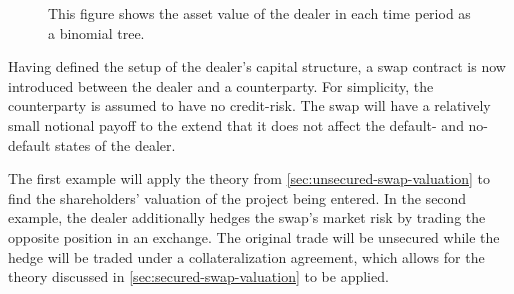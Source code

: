 \documentclass[main.tex]{subfiles}
\begin{document}
        \begin{figure}[H]
            \centering
            \caption{This figure shows the asset value of the dealer in each time period as a binomial tree.}
            \label{fig:example-asset-value-multi-period-dealer}
        \end{figure}

        Having defined the setup of the dealer's capital structure,
        a swap contract is now introduced between the dealer and a counterparty.
        For simplicity, the counterparty is assumed to have no credit-risk.
        The swap will have a relatively small notional payoff to the extend
        that it does not affect the default- and no-default states of the dealer.

        The first example will apply the theory from \cref{sec:unsecured-swap-valuation}
        to find the shareholders' valuation of the project being entered.
       In the second example, the dealer additionally hedges the swap's market risk 
       by trading the opposite position in an exchange.
       The original trade will be unsecured 
       while the hedge will be traded under a collateralization agreement,
       which allows for the theory discussed in \cref{sec:secured-swap-valuation} to be applied.
\end{document}
